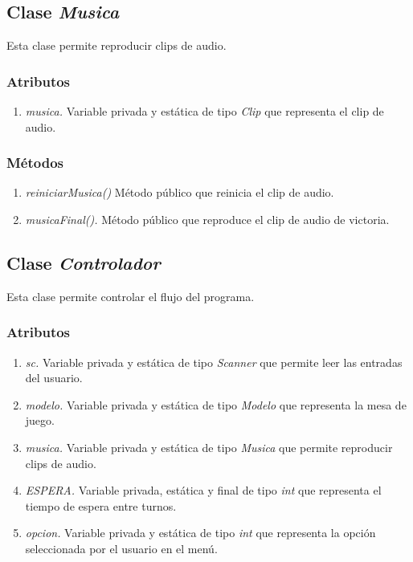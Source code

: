 \documentclass[12pt]{article}
\begin{document}
  \subsection{Clase \textit{Musica}}
  Esta clase permite reproducir clips de audio.

  \subsubsection{Atributos}
  \begin{enumerate}
    \item \textit{musica.} Variable privada y estática de tipo \textit{Clip} que representa el clip de audio.
  \end{enumerate}

  \subsubsection{Métodos}
  \begin{enumerate}
    \item \textit{reiniciarMusica()} Método público que reinicia el clip de audio.
    \item \textit{musicaFinal().} Método público que reproduce el clip de audio de victoria.
  \end{enumerate}

  \subsection{Clase \textit{Controlador}}
  Esta clase permite controlar el flujo del programa.

  \subsubsection{Atributos}
  \begin{enumerate}
    \item \textit{sc.} Variable privada y estática de tipo \textit{Scanner} que permite leer las entradas del usuario.
    \item \textit{modelo.} Variable privada y estática de tipo \textit{Modelo} que representa la mesa de juego.
    \item \textit{musica.} Variable privada y estática de tipo \textit{Musica} que permite reproducir clips de audio.
    \item \textit{ESPERA.} Variable privada, estática y final de tipo \textit{int} que representa el tiempo de espera entre turnos.
    \item \textit{opcion.} Variable privada y estática de tipo \textit{int} que representa la opción seleccionada por el usuario en el menú.
  \end{enumerate}
\end{document}
